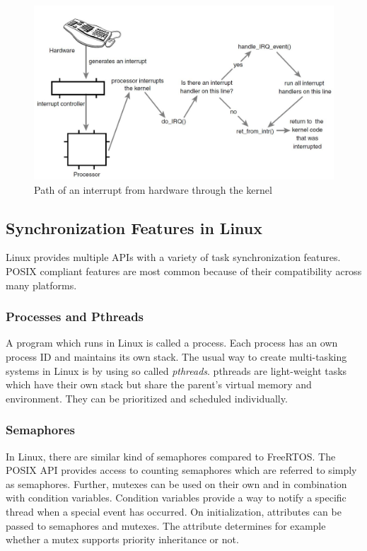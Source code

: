\begin{figure}[htb]
	\begin{center}
		\includegraphics[scale=0.33]{inputs/pictures_ch1/irq_path_linux}
	\end{center}
	\caption[Path of an interrupt from hardware through the kernel]{Path of an interrupt from hardware through the kernel \cite{love:lkd}} \label{fig_irq_path_linux}
\end{figure}

\subsection{Synchronization Features in Linux}
Linux provides multiple \acp{API} with a variety of task synchronization features. 
\ac{POSIX} compliant features are most common because of their compatibility across many platforms.
\subsubsection{Processes and Pthreads}
A program which runs in Linux is called a process. 
Each process has an own process ID and maintains its own stack. 
The usual way to create multi-tasking systems in Linux is by using so called \textit{pthreads}.
pthreads are light-weight tasks which have their own stack but share the parent's virtual memory and environment.
They can be prioritized and scheduled individually. 
\subsubsection{Semaphores}
In Linux, there are similar kind of semaphores compared to FreeRTOS.
The \ac{POSIX} \ac{API} provides access to counting semaphores which are referred to simply as semaphores.
Further, mutexes can be used on their own and in combination with condition variables.
Condition variables provide a way to notify a specific thread when a special event has occurred. 
On initialization, attributes can be passed to semaphores and mutexes.
The attribute determines for example whether a mutex supports priority inheritance or not.
